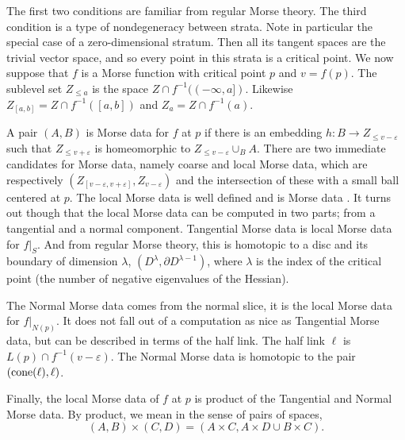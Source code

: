 The first two conditions are familiar from regular Morse theory. The third condition is a type of nondegeneracy between strata. Note in particular the special case of a zero-dimensional stratum. Then all its tangent spaces are the trivial vector space, and so every point in this strata is a critical point. We now suppose that $f$ is a Morse function with critical point $p$ and $v = f(p)$. The sublevel set $Z_{\leq a}$ is the space $Z \cap f^{-1}((-\infty,a])$. Likewise $Z_{[a,b]} = Z \cap f^{-1}([a,b])$ and $Z_a = Z \cap f^{-1}(a)$.

A pair $(A,B)$ is Morse data for $f$ at $p$ if there is an embedding $h : B \to Z_{\leq v-ε}$ such that $Z_{\leq v+ε}$ is homeomorphic to $Z_{\leq v-ε} \cup_B A$. There are two immediate candidates for Morse data, namely coarse and local Morse data, which are respectively $(Z_{[v-ε,v+ε]}, Z_{v-ε})$ and the intersection of these with a small ball centered at $p$. The local Morse data is well defined \cite[Prop 3.5.3]{Goresky1989} and is Morse data \cite[Thm 3.5.4]{Goresky1989}. It turns out though that the local Morse data can be computed in two parts; from a tangential and a normal component. Tangential Morse data is local Morse data for $f|_S$. And from regular Morse theory, this is homotopic to a disc and its boundary of dimension $λ$, $(D^λ, \partial D^{λ-1})$, where $λ$ is the index of the critical point (the number of negative eigenvalues of the Hessian).

The Normal Morse data comes from the normal slice, it is the local Morse data for $f|_{N(p)}$. It does not fall out of a computation as nice as Tangential Morse data, but can be described in terms of the half link. The half link $\ell$ is $L(p) \cap f^{-1}(v-ε)$. The Normal Morse data is homotopic to the pair $({\rm cone} (\ell), \ell)$.

Finally, the local Morse data of $f$ at $p$ is product of the Tangential and Normal Morse data. By product, we mean in the sense of pairs of spaces,
\[
(A,B) \times (C,D) = (A \times C, A \times D \cup B \times C).
\]



